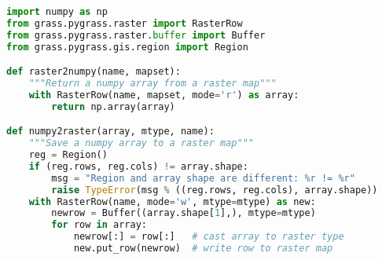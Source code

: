 \documentclass{standalone}
\begin{document}
\begin{lstlisting}[language=Python,linewidth=44.2em]
import numpy as np
from grass.pygrass.raster import RasterRow
from grass.pygrass.raster.buffer import Buffer
from grass.pygrass.gis.region import Region

def raster2numpy(name, mapset):
    """Return a numpy array from a raster map"""
    with RasterRow(name, mapset, mode='r') as array:
        return np.array(array)

def numpy2raster(array, mtype, name):
    """Save a numpy array to a raster map"""
    reg = Region()
    if (reg.rows, reg.cols) != array.shape:
        msg = "Region and array shape are different: %r != %r"
        raise TypeError(msg % ((reg.rows, reg.cols), array.shape))
    with RasterRow(name, mode='w', mtype=mtype) as new:
        newrow = Buffer((array.shape[1],), mtype=mtype)
        for row in array:
            newrow[:] = row[:]   # cast array to raster type
            new.put_row(newrow)  # write row to raster map
\end{lstlisting}
\end{document}

